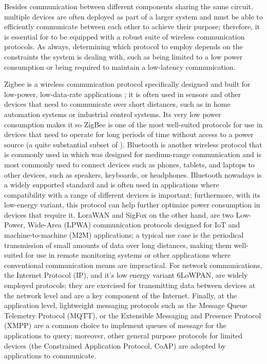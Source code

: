 \noindent Besides communication between different components sharing the same circuit, multiple devices are often deployed as part of a larger system and must be able to efficiently communicate between each other to achieve their purpose; therefore, it is essential for \ess to be equipped with a robust suite of wireless communication protocols. As always, determining which protocol to employ depends on the constraints the system is dealing with, such as being limited to a low power consumption or being required to maintain a low-latency communication.

Zigbee is a wireless communication protocol specifically designed and built for low-power, low-data-rate applications \cite{Zigbee}; it is often used in sensors and other devices that need to communicate over short distances, such as in home automation systems or industrial control systems. Its very low power consumption makes it so ZigBee is one of the most well-suited protocols for use in devices that need to operate for long periods of time without access to a power source (\ie a quite substantial subset of \ess).
Bluetooth is another wireless protocol that is commonly used in \es which was designed for medium-range communication and is most commonly used to connect devices such as phones, tablets, and laptops to other devices, such as speakers, keyboards, or headphones. Bluetooth nowadays is a widely supported standard and is often used in applications where compatibility with a range of different devices is important; furthermore, with its low-energy variant, this protocol can help further optimize power consumption in devices that require it.
LoraWAN and SigFox on the other hand, are two Low-Power, Wide-Area (LPWA) communication protocols designed for IoT and machine-to-machine (M2M) applications; a typical use case is the periodical transmission of small amounts of data over long distances, making them well-suited for use in remote monitoring systems or other applications where conventional communication means are impractical.
For network communications, the Internet Protocol (IP), and it's low energy variant 6LoWPAN, are widely employed protocols; they are exercised for transmitting data between devices at the network level and are a key component of the Internet.
Finally, at the application level, lightweight messaging protocols such as the Message Queue Telemetry Protocol (MQTT), or the Extensible Messaging and Presence Protocol (XMPP) are a common choice to implement queues of message for the applications to query; moreover, other general purpose protocols for limited devices (\eg the Constrained Application Protocol, CoAP) are adopted by applications to communicate. 





